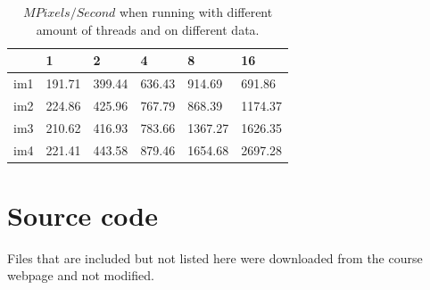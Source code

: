 \documentclass[a4paper,11pt]{article}
\begin{document}
\begin{table}[h!]
  \label{mpixelspersecond2}
  \caption{$MPixels/Second$ when running with different amount of threads and on different data.}
  \begin{tabular}[h]{|l|l|l|l|l|l|}
    \hline
                  & 1     & 2     & 4        & 8       & 16\\
    \hline
    im1           & 191.71 & 399.44 & 636.43 & 914.69  & 691.86\\ 
    im2           & 224.86 & 425.96 & 767.79 & 868.39  & 1174.37\\ 
    im3           & 210.62 & 416.93 & 783.66 & 1367.27 & 1626.35\\ 
    im4           & 221.41 & 443.58 & 879.46 & 1654.68 & 2697.28\\
    \hline
  \end{tabular}
\end{table}

\clearpage
\section{Source code}
Files that are included but not listed here were downloaded from the course webpage and not modified.


\clearpage

\clearpage

\clearpage



\end{document}
